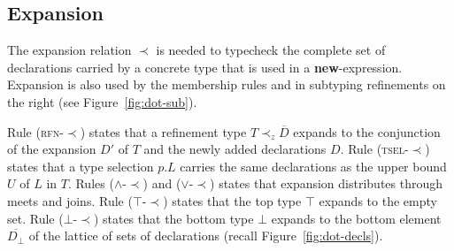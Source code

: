 \documentclass[9pt]{sigplanconf}
\newcommand{\figref}[1]
        {Figure~\ref{fig:#1}}
\newcommand{\expand}{\prec}
\newcommand{\tand}{\wedge}
\newcommand{\tor}{\vee}
\newcommand{\seq}[1]{\overline{#1}}
\newcommand{\Bot}{\bot}%
\begin{document}
\subsection{Expansion}
      
The expansion relation $\expand$ is needed to typecheck the complete
set of declarations carried by a concrete type that is used in a
\textbf{new}-expression. Expansion is also used by the membership
rules and in subtyping refinements on the right (see
\figref{dot-sub}).

Rule (\textsc{rfn-$\expand$}) states that a refinement type $T
\expand_z {\seq D}$ expands to the conjunction of the expansion $D'$
of $T$ and the newly added declarations $D$. Rule
(\textsc{tsel-$\expand$}) states that a type selection $p.L$ carries
the same declarations as the upper bound $U$ of $L$ in $T$.  Rules
($\tand$-$\expand$) and ($\tor$-$\expand$) states that expansion
distributes through meets and joins.  Rule (\textsc{$\top$-$\expand$})
states that the top type $\top$ expands to the empty set. Rule
(\textsc{$\bot$-$\expand$}) states that the bottom type $\bot$ expands
to the bottom element $\seq{D_\Bot}$ of the lattice of sets of
declarations (recall \figref{dot-decls}).
\end{document}

